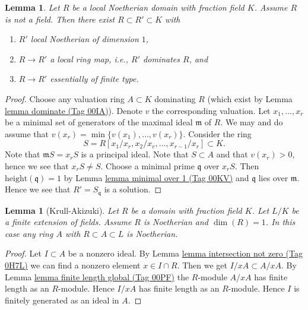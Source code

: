 \documentclass{amsart}
\theoremstyle{plain}
\newtheorem{lemma}[subsection]{Lemma}
\theoremstyle{definition}
\theoremstyle{remark}
\numberwithin{equation}{subsection}
\begin{document}
\begin{lemma}
\label{algebra-lemma-dominate-by-dimension-1}
Let $R$ be a local Noetherian domain with fraction field $K$.
Assume $R$ is not a field.
Then there exist $R \subset R' \subset K$ with
\begin{enumerate}
\item $R'$ local Noetherian of dimension $1$,
\item $R \to R'$ a local ring map, i.e., $R'$ dominates $R$, and
\item $R \to R'$ essentially of finite type.
\end{enumerate}
\end{lemma}

\begin{proof}
Choose any valuation ring $A \subset K$ dominating $R$ (which
exist by Lemma \href{https://stacks.math.columbia.edu/tag/00IA}{lemma dominate (Tag 00IA)}).
Denote $v$ the corresponding valuation.
Let $x_1, \ldots, x_r$ be a minimal set of generators of the
maximal ideal $\mathfrak m$ of $R$. We may and do assume that
$v(x_r) = \min\{v(x_1), \ldots, v(x_r)\}$. Consider the ring
$$
S = R[x_1/x_r, x_2/x_r, \ldots, x_{r - 1}/x_r] \subset K.
$$
Note that $\mathfrak mS = x_rS$ is a principal ideal.
Note that $S \subset A$ and that $v(x_r) > 0$, hence we see
that $x_rS \not = S$. Choose a minimal prime $\mathfrak q$
over $x_rS$. Then $\text{height}(\mathfrak q) = 1$ by
Lemma \href{https://stacks.math.columbia.edu/tag/00KV}{lemma minimal over 1 (Tag 00KV)}
and $\mathfrak q$ lies over $\mathfrak m$. Hence we
see that $R' = S_{\mathfrak q}$ is a solution.
\end{proof}


\begin{lemma}[Krull-Akizuki]
\label{algebra-lemma-krull-akizuki}
Let $R$ be a domain with fraction field $K$.
Let $L/K$ be a finite extension of fields.
Assume $R$ is Noetherian and $\dim(R) = 1$.
In this case any ring $A$ with $R \subset A \subset L$ is
Noetherian.
\end{lemma}

\begin{proof}
Let $I \subset A$ be a nonzero ideal. By
Lemma \href{https://stacks.math.columbia.edu/tag/0H7L}{lemma intersection not zero (Tag 0H7L)}
we can find a nonzero element $x \in I \cap R$.
Then we get $I/xA \subset A/xA$. By Lemma \href{https://stacks.math.columbia.edu/tag/00PF}{lemma finite length global (Tag 00PF)}
the $R$-module $A/xA$ has finite length as an $R$-module. Hence
$I/xA$ has finite length as an $R$-module. Hence $I$ is finitely
generated as an ideal in $A$.
\end{proof}
\end{document}
